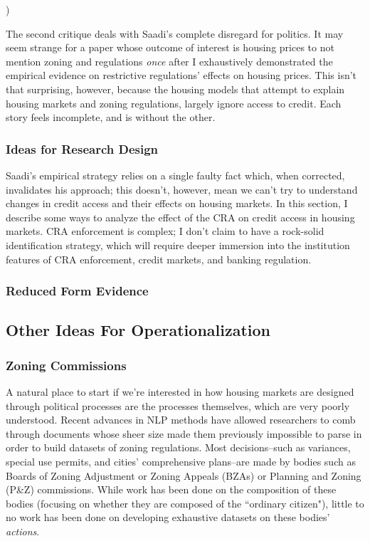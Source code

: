 )\documentclass{article}[11pt]
\begin{document}
The second critique deals with Saadi's complete disregard for politics. It may seem strange for a paper whose outcome of interest is housing prices to not mention zoning and regulations \textit{once} after I exhaustively demonstrated the empirical evidence on restrictive regulations' effects on housing prices. This isn't that surprising, however, because the housing models that attempt to explain housing markets and zoning regulations, largely ignore access to credit. Each story feels incomplete, and is without the other.

		\subsubsection{Ideas for Research Design}
Saadi's empirical strategy relies on a single faulty fact which, when corrected, invalidates his approach; this doesn't, however, mean we can't try to understand changes in credit access and their effects on housing markets. In this section, I describe some ways to analyze the effect of the CRA on credit access in housing markets. CRA enforcement is complex; I don't claim to have a rock-solid identification strategy, which will require deeper immersion into the institution features of CRA enforcement, credit markets, and banking regulation.



		\subsubsection{Reduced Form Evidence}



	\subsection{Other Ideas For Operationalization}
		
		\subsubsection{Zoning Commissions}
A natural place to start if we're interested in how housing markets are designed through political processes are the processes themselves, which are very poorly understood. \citep{gyourko2015regulation} Recent advances in NLP methods have allowed researchers to comb through documents whose sheer size made them previously impossible to parse in order to build datasets of zoning regulations. \citep{bartik2024costs} Most decisions--such as variances, special use permits, and cities' comprehensive plans--are made by bodies such as Boards of Zoning Adjustment or Zoning Appeals (BZAs) or Planning and Zoning (P\&Z) commissions. \citep{anderson2008study} While work has been done on the composition of these bodies (focusing on whether they are composed of the ``ordinary citizen"), little to no work has been done on developing exhaustive datasets on these bodies' \textit{actions}.
\end{document}

